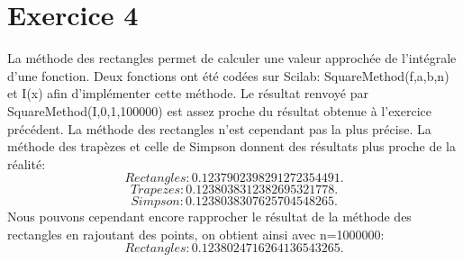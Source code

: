 \documentclass{article}
\begin{document}
\section{Exercice 4}
La méthode des rectangles permet de calculer une valeur approchée de l'intégrale d'une fonction. Deux fonctions ont été codées sur Scilab: SquareMethod(f,a,b,n) et I(x) afin d'implémenter cette méthode.
Le résultat renvoyé par SquareMethod(I,0,1,100000) est assez proche du résultat obtenue à l'exercice précédent. La méthode des rectangles n'est cependant pas la plus précise. La méthode des trapèzes et celle de Simpson donnent des résultats plus proche de la réalité:
\begin{displaymath}
    Rectangles: 0.1237902398291272354491.
\end{displaymath}
\begin{displaymath} 
    Trapezes: 0.1238038312382695321778.
\end{displaymath}
\begin{displaymath}
    Simpson: 0.1238038307625704548265.
\end{displaymath}
Nous pouvons cependant encore rapprocher le résultat de la méthode des rectangles en rajoutant des points, on obtient ainsi avec n=1000000:\\
\begin{displaymath}
    Rectangles: 0.1238024716264136543265.
\end{displaymath}
\end{document}
